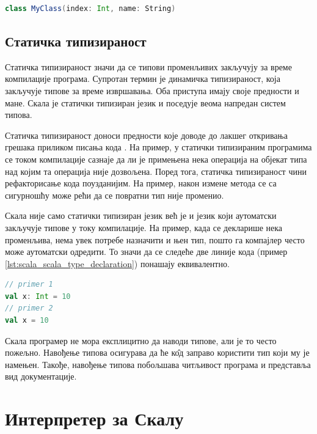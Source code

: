 \documentclass[12pt,oneside]{memoir}
\begin{document}
\begin{lstlisting}[caption={Декларација класе у језику Скала}, language=Scala, label={lst:scala_scala_class_declaration}]
class MyClass(index: Int, name: String)

\end{lstlisting}

\subsection{Статичка типизираност}
\label{subsec:scala_stat_tip}

Статичка типизираност значи да се типови променљивих закључују за време компилације програма. Супротан термин је динамичка типизираност, која закључује типове за време извршавања. Оба приступа имају своје предности и мане. Скала је статички типизиран језик и поседује веома напредан систем типова.

Статичка типизираност доноси предности које доводе до лакшег откривања грешака приликом писања кода \cite{scala_prog}. На пример, у статички типизираним програмима се током компилације сазнаје да ли је примењена нека операција на објекат типа над којим та операција није дозвољена. Поред тога, статичка типизираност чини рефакторисање кода поузданијим. На пример, након измене метода се са сигурношћу може рећи да се повратни тип није променио.

Скала није само статички типизиран језик већ је и језик који аутоматски закључује типове у току компилације. На пример, када се декларише нека променљива, нема увек потребе назначити и њен тип, пошто га компајлер често може аутоматски одредити. То значи да се следеће две линије кода (пример \ref{lst:scala_scala_type_declaration}) понашају еквивалентно.

\begin{lstlisting}[caption={Декларација променљиве са и без експлицитног навођења типа}, language=Scala, label={lst:scala_scala_type_declaration}, basicstyle=\small]
// primer 1
val x: Int = 10
// primer 2
val x = 10
\end{lstlisting}

Скала програмер не мора експлицитно да наводи типове, али је то  често пожељно. Навођење типова осигурава да ће к\^{о}д заправо користити тип који му је намењен. Такође, навођење типова побољшава читљивост програма и представља вид документације.

\section{Интерпретер за Скалу}
\label{sec:scala_interpr}
\end{document}
